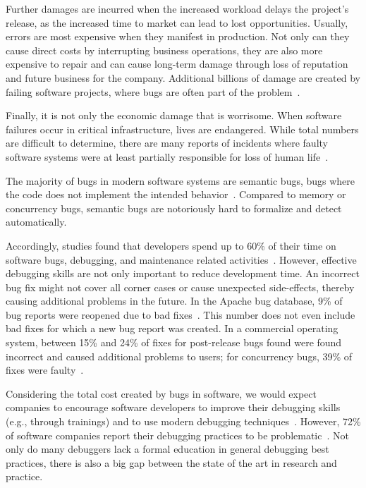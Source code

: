 Further damages are incurred when the increased workload delays the project's release, as the increased time to market can lead to lost opportunities.
Usually, errors are most expensive when they manifest in production.
Not only can they cause direct costs by interrupting business operations, they are also more expensive to repair and can cause long-term damage through loss of reputation and future business for the company.
Additional billions of damage are created by failing software projects, where bugs are often part of the problem~\cite{charette05:why_software_fails}.

Finally, it is not only the economic damage that is worrisome.
When software failures occur in critical infrastructure, lives are endangered.
While total numbers are difficult to determine, there are many reports of incidents where faulty software systems were at least partially responsible for loss of human life~\cite{zhivich09:the_real_cost}.

\medskip\medskip\noindent
The majority of bugs in modern software systems are semantic bugs, \ie bugs where the code does not implement the intended behavior~\cite{li06:have_things_changed_now}.
Compared to memory or concurrency bugs, semantic bugs are notoriously hard to formalize and detect automatically.

Accordingly, studies found that developers spend up to 60\% of their time on software bugs, debugging, and maintenance related activities~\cite{ballou08:improving_software_quality, hailpern02:software_debugging_testing, beizer03:software_testing_techniques}.
However, effective debugging skills are not only important to reduce development time.
An incorrect bug fix might not cover all corner cases or cause unexpected side-effects, thereby causing additional problems in the future.
In the Apache bug database, 9\% of bug reports were reopened due to bad fixes~\cite{gu10:has_the_bug_really}.
This number does not even include bad fixes for which a new bug report was created.
In a commercial operating system, between 15\% and 24\% of fixes for post-release bugs found were found incorrect and caused additional problems to users; for concurrency bugs, 39\% of fixes were faulty~\cite{yin11:how_do_fixes_become}.

Considering the total cost created by bugs in software, we would expect companies to encourage software developers to improve their debugging skills (e.g., through trainings) and to use modern debugging techniques~\cite{zhivich09:the_real_cost}.
However, 72\% of software companies report their debugging practices to be problematic~\cite{ballou08:improving_software_quality}.
Not only do many debuggers lack a formal education in general debugging best practices, there is also a big gap between the state of the art in research and practice.


